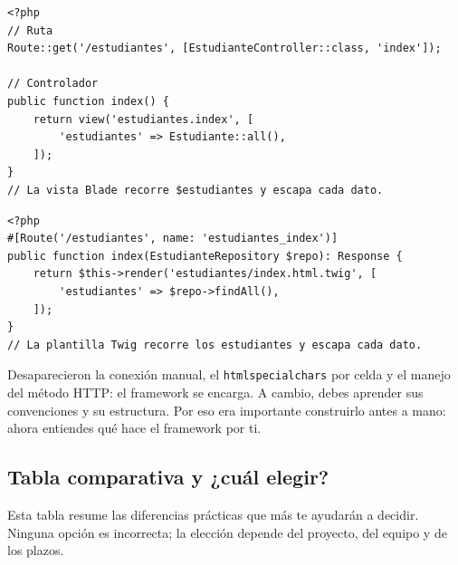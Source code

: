 \documentclass[11pt]{article}
\begin{document}
\begin{cajacodigo}
\begin{lstlisting}[style=php]
<?php
// Ruta
Route::get('/estudiantes', [EstudianteController::class, 'index']);

// Controlador
public function index() {
    return view('estudiantes.index', [
        'estudiantes' => Estudiante::all(),
    ]);
}
// La vista Blade recorre $estudiantes y escapa cada dato.
\end{lstlisting}
\end{cajacodigo}
\vspace{2pt}
\begin{cajacodigo}
\begin{lstlisting}[style=php]
<?php
#[Route('/estudiantes', name: 'estudiantes_index')]
public function index(EstudianteRepository $repo): Response {
    return $this->render('estudiantes/index.html.twig', [
        'estudiantes' => $repo->findAll(),
    ]);
}
// La plantilla Twig recorre los estudiantes y escapa cada dato.
\end{lstlisting}
\end{cajacodigo}
\vspace{2pt}
Desaparecieron la conexión manual, el \texttt{htmlspecialchars} por celda y el manejo del método HTTP: el framework se encarga. A cambio, debes aprender sus convenciones y su estructura. Por eso era importante construirlo antes a mano: ahora entiendes qué hace el framework por ti.

\subsection{Tabla comparativa y ¿cuál elegir?}
Esta tabla resume las diferencias prácticas que más te ayudarán a decidir. Ninguna opción es incorrecta; la elección depende del proyecto, del equipo y de los plazos.
\end{document}
